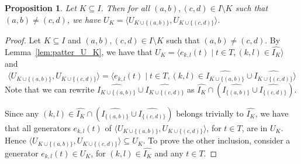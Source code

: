 \documentclass[11pt,letterpaper]{amsart}
\newtheorem{proposition}[theorem]{Proposition}
\begin{document}
\begin{proposition}\label{prop:pattern_RC1}
    Let $K\subseteq I$. Then for all $(a,b),(c,d)\in I\setminus K$ such that $(a,b)\neq (c,d)$, we have $U_K=\langle U_{K\cup\{(a,b)\}}, U_{K\cup\{(c,d)\}} \rangle$.
\end{proposition}
\begin{proof}
    Let $K\subseteq I$ and $(a,b),(c,d)\in I\setminus K$ such that $(a,b)\neq (c,d)$.
    By Lemma~\ref{lem:patter_U_K}, we have that $U_K = \langle e_{k,l}(t)\mid t\in T, (k,l)\in \widehat{I_K}\rangle$ and $$\langle U_{K\cup\{(a,b)\}}, U_{K\cup\{(c,d)\}}\rangle = \langle  e_{k,l}(t)\mid t\in T, (k,l)\in \widehat{I_{K\cup\{(a,b)\}}}\cup \widehat{I_{K\cup\{(c,d)\}}}\rangle$$
Note that we can rewrite $\widehat{I_{K\cup\{(a,b)\}}}\cup \widehat{I_{K\cup\{(c,d)\}}}$ as 
$\widehat{I_K}\cap (\widehat{I_{\{(a,b)\}}}\cup \widehat{I_{\{(c,d)\}}})$.

Since any $(k,l)\in \widehat{I_K}\cap (\widehat{I_{\{(a,b)\}}}\cup \widehat{I_{\{(c,d)\}}})$ belongs trivially to $\widehat{I_K}$, we have that all generators $e_{k,l}(t)$ of $\langle U_{K\cup \{(a,b)\}}, U_{K\cup \{(c,d)\}}\rangle$, for $t\in T$, are in $U_K$. Hence
$\langle U_{K\cup \{(a,b)\}}, U_{K\cup \{(c,d)\}}\rangle \subseteq U_K$.
To prove the other inclusion, consider a generator $e_{k,l}(t)\in U_K$, for $(k,l)\in \widehat{I_K}$ and any $t\in T$.


\end{proof}
\end{document}

